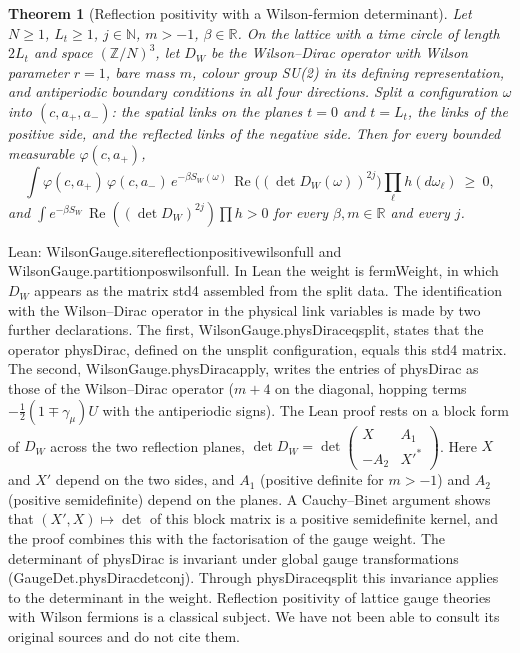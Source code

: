 \documentclass[11pt,a4paper]{article}
\newtheorem{theorem}{Theorem}[section]
\theoremstyle{definition}
\theoremstyle{remark}
\newcommand{\leanus}{\textunderscore\allowbreak{}}
\newcommand{\leandot}{.\allowbreak{}}
\newcommand{\lean}[1]{{\ttfamily\let\_\leanus #1}}
\newcommand{\Z}{\mathbb{Z}}
\newcommand{\R}{\mathbb{R}}
\newcommand{\N}{\mathbb{N}}
\renewcommand{\Re}{\operatorname{Re}}
\begin{document}
\begin{theorem}[Reflection positivity with a Wilson-fermion determinant]\label{thm:fermion}
Let $N\ge1$, $L_t\ge1$, $j\in\N$, $m>-1$, $\beta\in\R$. On the lattice with a time circle of length $2L_t$ and space $(\Z/N)^3$, let $D_W$ be the Wilson--Dirac operator with Wilson parameter $r=1$, bare mass $m$, colour group SU(2) in its defining representation, and antiperiodic boundary conditions in all four directions. Split a configuration $\omega$ into $(c,a_+,a_-)$: the spatial links on the planes $t=0$ and $t=L_t$, the links of the positive side, and the reflected links of the negative side. Then for every bounded measurable $\varphi(c,a_+)$,
\[
\int \varphi(c,a_+)\,\varphi(c,a_-)\,e^{-\beta S_W(\omega)}\,\Re\bigl((\det D_W(\omega))^{2j}\bigr)\prod_\ell h(d\omega_\ell)\ \ge\ 0,
\]
and $\int e^{-\beta S_W}\,\Re((\det D_W)^{2j})\prod h>0$ for every $\beta,m\in\R$ and every $j$.
\end{theorem}
Lean: \lean{WilsonGauge\leandot{}site\_reflection\_positive\_wilson\_full} and \lean{WilsonGauge\leandot{}partition\_pos\_wilson\_full}. In Lean the weight is \lean{fermWeight}, in which $D_W$ appears as the matrix \lean{std4} assembled from the split data. The identification with the Wilson--Dirac operator in the physical link variables is made by two further declarations. The first, \lean{WilsonGauge\leandot{}physDirac\_eq\_split}, states that the operator \lean{physDirac}, defined on the unsplit configuration, equals this \lean{std4} matrix. The second, \lean{WilsonGauge\leandot{}physDirac\_apply}, writes the entries of \lean{physDirac} as those of the Wilson--Dirac operator ($m+4$ on the diagonal, hopping terms $-\frac12(1\mp\gamma_\mu)U$ with the antiperiodic signs). The Lean proof rests on a block form of $D_W$ across the two reflection planes, $\det D_W=\det\begin{pmatrix}X&A_1\\-A_2&X'^{*}\end{pmatrix}$. Here $X$ and $X'$ depend on the two sides, and $A_1$ (positive definite for $m>-1$) and $A_2$ (positive semidefinite) depend on the planes. A Cauchy--Binet argument shows that $(X',X)\mapsto\det$ of this block matrix is a positive semidefinite kernel, and the proof combines this with the factorisation of the gauge weight. The determinant of \lean{physDirac} is invariant under global gauge transformations (\lean{GaugeDet\leandot{}physDirac\_det\_conj}). Through \lean{physDirac\_eq\_split} this invariance applies to the determinant in the weight. Reflection positivity of lattice gauge theories with Wilson fermions is a classical subject. We have not been able to consult its original sources and do not cite them.
\end{document}
